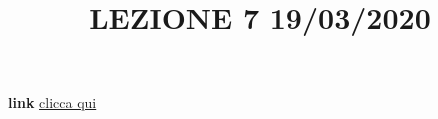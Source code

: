 \title{LEZIONE 7 19/03/2020}\newline
\textbf{link} \href{https://web.microsoftstream.com/video/2feefb06-11cb-4de4-ac19-dcc5fe175a98?list=user&userId=faa91214-a6f5-40d7-8875-253fd49b8ce1}{clicca qui}
\section{}